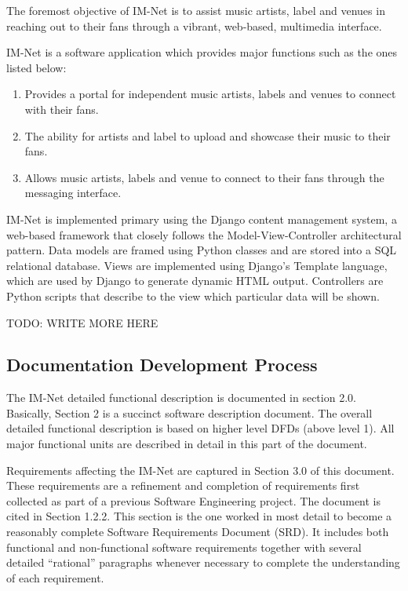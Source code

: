 \documentclass[letterpaper,12pt]{article}
\begin{document}
{The foremost objective of IM-Net is to assist music artists, label and venues in reaching out to their fans through a vibrant, web-based, multimedia interface.

IM-Net is a software application which provides major functions such as the ones listed below:

\begin{enumerate}
\item  Provides a portal for independent music artists, labels and venues to connect with their fans.

\item  The ability for artists and label to upload and showcase their music to their fans.

\item  Allows music artists, labels and venue to connect to their fans through the messaging interface.
\end{enumerate}

IM-Net is implemented primary using the Django content management system, a web-based framework that closely follows the Model-View-Controller architectural pattern. Data models are framed using Python classes and are stored into a SQL relational database. Views are implemented using Django's Template language, which are used by Django to generate dynamic HTML output. Controllers are Python scripts that describe to the view which particular data will be shown. 

TODO: WRITE MORE HERE

\textcolor{subsection}{\subsection{Documentation Development Process}}

The IM-Net detailed functional description is documented in section 2.0. Basically, Section 2 is a succinct software description document. The overall detailed functional description is based on higher level DFDs (above level 1). All major functional units are described in detail in this part of the document.

Requirements affecting the IM-Net are captured in Section 3.0 of this document.  These requirements are a refinement and completion of requirements first collected as part of a previous Software Engineering project. The document is cited in Section 1.2.2. This section is the one worked in most detail to become a reasonably complete Software Requirements Document (SRD). It includes both functional and non-functional software requirements together with several detailed ``rational'' paragraphs whenever necessary to complete the understanding of each requirement.

}
\end{document}
